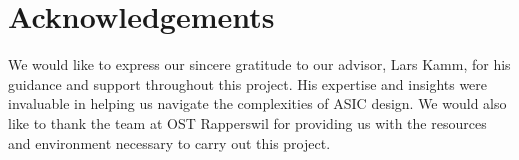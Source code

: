 \section*{\huge Acknowledgements}
\label{chap:danksagung}
We would like to express our sincere gratitude to our advisor, Lars Kamm, for his guidance and support throughout this project. His expertise and insights were invaluable in helping us navigate the complexities of \ac{ASIC} design. We would also like to thank the team at OST Rapperswil for providing us with the resources and environment necessary to carry out this project.




\clearpage